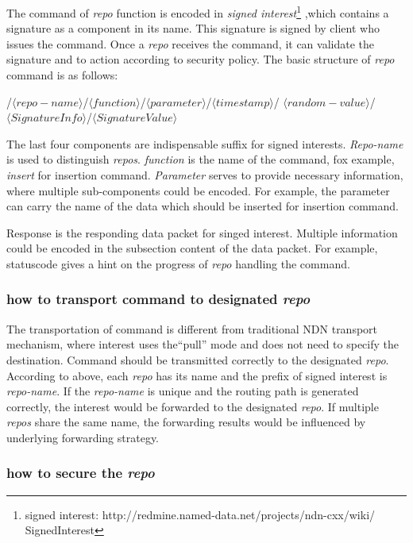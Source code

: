 \documentclass[conference]{IEEEtran}
\begin{document}
The command of \emph{repo} function is encoded in \emph{signed interest}\footnote{signed interest: http://redmine.named-data.net/projects/ndn-cxx/wiki/
SignedInterest} ,which contains a signature as a component in its name. This signature is signed by client who issues the command. Once a \emph{repo} receives the command, it can validate the signature and to action according to security policy. The basic structure of \emph{repo} command is as follows:

/$\langle repo-name\rangle$/$\langle function\rangle$/$\langle parameter\rangle$/$\langle timestamp\rangle$/
$\langle random-value\rangle$/$\langle SignatureInfo\rangle$/$\langle SignatureValue\rangle$

The last four components are indispensable suffix for signed interests. \emph{Repo-name} is used to distinguish \emph{repos}. \emph{function} is the name of the command, fox example, \emph{insert} for insertion command. \emph{Parameter} serves to provide necessary information, where multiple sub-components could be encoded. For example, the parameter can carry the name of the data which should be inserted for insertion command.

Response is the responding data packet for singed interest. Multiple information could be encoded in the subsection content of the data packet. For example, statuscode gives a hint on the progress of \emph{repo} handling the command.

\subsubsection{how to transport command to designated \emph{repo}}

The transportation of command is different from traditional NDN transport mechanism, where interest uses the``pull'' mode and does not need to specify the destination. Command should be transmitted correctly to the designated \emph{repo}. According to above, each \emph{repo} has its name and the prefix of signed interest is \emph{repo-name}. If the \emph{repo-name} is unique and the routing path is generated correctly, the interest would be forwarded to the designated \emph{repo}. If multiple \emph{repos} share the same name, the forwarding results would be influenced by underlying forwarding strategy.

\subsubsection{how to secure the \emph{repo}}
\end{document}
